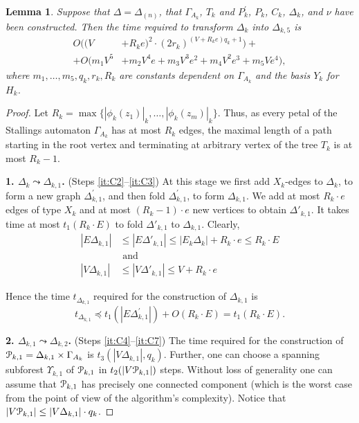\documentclass[a4paper,12pt]{article}
\newcommand{\G}{\Gamma }
\newcommand{\D}{\Delta }
\newcommand{\U}{\Upsilon }
\newcommand{\cP}{{\cal{P}}}
\newtheorem{lemma}[theorem]{Lemma}
\numberwithin{equation}{section}
\numberwithin{figure}{section}
\begin{document}
\begin{lemma}\label{lem:resolution} Suppose that $\D = \D_{(n)}$,
that $\G_{A_k}$, $T_k$ and $P_k^\prime$, $P_k$,  $C_k$, $\D_k$, and $\nu$  have been
constructed. Then the time required to transform $\D_k$ into $\D_{k,5}$ is
\[\begin{split}
O((V &+R_k e)^2\cdot (2r_k)^{(V + R_k e) q_k +1})+\\
+O(m_1 V^5 &+ m_2V^4 e +m_3 V^3 e^2 +m_4 V^2 e^3 + m_5 V e^4),
\end{split}
\]
where $m_1, \ldots, m_5, q_k, r_k,  R_k $ are constants dependent on
$\G_{A_k}$ and the basis $Y_k$ for $H_k$.

\end{lemma}

\begin{proof} Let $R_k  = \max \{ |\phi_k(z_1)|_k, \ldots, |\phi_k(z_m)|_k\}$. Thus, as
every petal of the Stallings automaton $\G_{A_k}$ has at most $R_k$
edges, the maximal length of a path starting in the root vertex
and terminating at arbitrary vertex of the tree $T_k$ is at most
$R_k-1$.

{\bf 1. $\D_k \leadsto \D_{k,1}$.}  (Steps \ref{it:C2}--\ref{it:C3}) At this stage we first add
$X_k$-edges to $\D_k$, to form a new graph $\D^\prime_{k,1}$, and then
fold $\D^\prime_{k,1}$, to form $\D_{k,1}$.  We add at most $R_k \cdot e$
edges of type $X_k$ and at most $(R_k-1)\cdot e$ new vertices to
obtain $\D'_{k,1}$. It takes time at most $t_1(R_k \cdot E )$ to fold
$\D'_{k,1}$ to  $\D_{k,1}$. Clearly,
\begin{equation}\label{evth1}
\begin{split}
|E\D_{k,1} | &\le |E\D'_{k,1} | \le |E_k\D_k | + R_k \cdot e \le
R_k \cdot E\\
&{\textrm{ and }}\\
|V \D_{k,1}| &\le |V \D'_{k,1} | \le V + R_k\cdot e
\end{split}
\end{equation}


Hence the time $t_{\D_{k,1}}$ required for the construction of $\D_{k,1}$
is
\begin{equation}\label{theta1}
t_{\D_{k,1}} \preceq t_1(|E \D_{k,1}^\prime |) + O(R_k \cdot E) =t_1(R_k
\cdot E) .
\end{equation}


{\bf 2. $\D_{k,1} \leadsto \D_{k,2}$.}  (Steps \ref{it:C4}--\ref{it:C7}) The time required for the
construction of $\cP_{k,1}=\D_{k,1}\times \G_{A_k}$ is $t_3(|V \D_{k,1}|, q_k)$.
Further, one can choose a spanning subforest $\U_{k,1}$ of $\cP_{k,1}$ in
$t_2(|V\cP_{k,1}|)$ steps. Without loss of generality one can assume
that $\cP_{k,1}$ has precisely one connected component (which is the
worst case from the point of view of the algorithm's complexity).
Notice that $|V\cP_{k,1}| \le |V\D_{k,1}|\cdot q_k$.



\end{proof}
\end{document}
